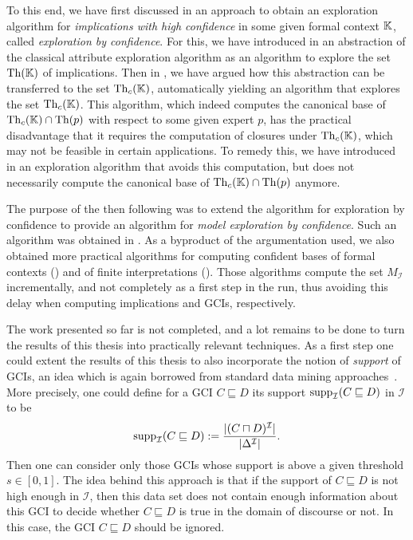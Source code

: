 To this end, we have first discussed in  an approach to obtain an
exploration algorithm for \emph{implications with high confidence} in some given formal
context ${\mathbb{K}}$, called \emph{exploration by confidence}.  For this, we have introduced
in  an abstraction of the classical attribute exploration
algorithm as an algorithm to explore the set $\operatorname{Th}({\mathbb{K}})$ of implications.  Then in
, we have argued how this abstraction can be transferred to the set
$\operatorname{Th}_{c}({\mathbb{K}})$, automatically yielding an algorithm that explores the set $\operatorname{Th}_{c}({\mathbb{K}})$.  This algorithm, which indeed computes the canonical base of $\operatorname{Th}_{c}({\mathbb{K}}) \cap
\operatorname{Th}(p)$ with respect to some given expert $p$, has the practical disadvantage that it
requires the computation of closures under $\operatorname{Th}_{c}({\mathbb{K}})$, which may not be feasible in
certain applications.  To remedy this, we have introduced in  an
exploration algorithm that avoids this computation, but does not necessarily compute the
canonical base of $\operatorname{Th}_{c}({\mathbb{K}}) \cap \operatorname{Th}(p)$ anymore.

The purpose of the then following  was to extend the algorithm
for exploration by confidence to provide an algorithm for \emph{model exploration by
  confidence}.  Such an algorithm was obtained in .  As a
byproduct of the argumentation used, we also obtained more practical algorithms for
computing confident bases of formal contexts () and of finite
interpretations ().  Those algorithms compute the set
$M_{\mathcal{I}}$ incrementally, and not completely as a first step in the run, thus
avoiding this delay when computing implications and GCIs, respectively.

The work presented so far is not completed, and a lot remains to be done to turn the
results of this thesis into practically relevant techniques.  As a first step one could
extent the results of this thesis to also incorporate the notion of \emph{support} of
GCIs, an idea which is again borrowed from standard data mining
approaches~\cite{arules:agrawal:association-rules}.  More precisely, one could define for
a GCI $C \sqsubseteq D$ its support $\operatorname{supp}_{\mathcal{I}}(C \sqsubseteq D)$ in
$\mathcal{I}$ to be
\begin{equation*}
  \operatorname{supp}_{\mathcal{I}}( C \sqsubseteq D ) := \frac{ \lvert(C \sqcap D)^{\mathcal{I}}\rvert }{
    \lvert \Delta^{\mathcal{I}} \rvert }.
\end{equation*}
Then one can consider only those GCIs whose support is above a given threshold $s \in
[0,1]$.  The idea behind this approach is that if the support of $C \sqsubseteq D$ is not
high enough in $\mathcal{I}$, then this data set does not contain enough information about
this GCI to decide whether $C \sqsubseteq D$ is true in the domain of discourse or not.
In this case, the GCI $C \sqsubseteq D$ should be ignored.

